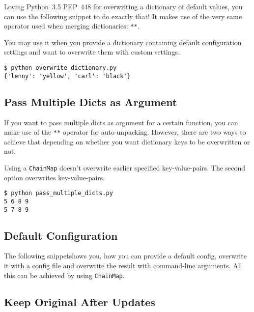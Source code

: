 Loving Python~3.5 PEP~448 for overwriting a dictionary of default values, you can use the following snippet to do exactly that!
It makes use of the very same operator used when merging dictionaries: \lstinline{**}.



You may use it when you provide a dictionary containing default configuration settings and want to overwrite them with custom settings.

\begin{lstlisting}[caption=Output of overwrite\_dictionary.py]
$ python overwrite_dictionary.py
{'lenny': 'yellow', 'carl': 'black'}
\end{lstlisting}


\subsection{Pass Multiple Dicts as Argument}

If you want to pass multiple dicts as argument for a certain function, you can make use of the \lstinline{**} operator for auto-unpacking.
However, there are two ways to achieve that depending on whether you want dictionary keys to be overwritten or not.



Using a \lstinline{ChainMap} doesn't overwrite earlier specified key-value-pairs.
The second option overwrites key-value-pairs.

\begin{lstlisting}[caption=Output of pass\_multiple\_dicts.py]
$ python pass_multiple_dicts.py
5 6 8 9
5 7 8 9
\end{lstlisting}


\subsection{Default Configuration}

The following snippetshows you, how you can provide a default config, overwrite it with a config file and overwrite the result with command-line arguments.
All this can be achieved by using \lstinline{ChainMap}.




\subsection{Keep Original After Updates}

